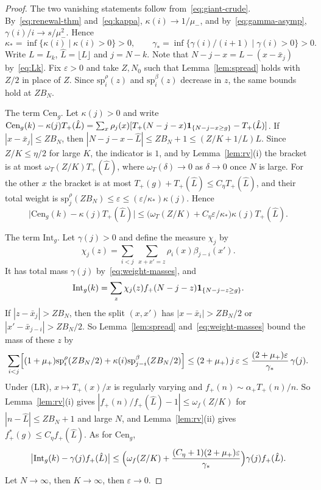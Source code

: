 \begin{proof}
The two vanishing statements follow from~\eqref{eq:giant-crude}.
By~\eqref{eq:renewal-thm} and~\eqref{eq:kappa}, $\kappa(i)\to1/\mu_\minus$, and
by~\eqref{eq:gamma-asymp}, $\gamma(i)/i\to s/\mu_\minus^2$. Hence
\[
 \kappa_*=\inf\{\kappa(i)\mid\kappa(i)>0\}>0,\qquad
 \gamma_*=\inf\{\gamma(i)/(i+1)\mid\gamma(i)>0\}>0 .
\]
Write $L=L_k$, $\hat L=\lfloor L\rfloor$ and $j=N-k$. Note that
$N-j-x=L-(x-\bar x_j)$ by~\eqref{eq:Lk}. Fix $\varepsilon>0$ and take
$Z,N_0$ such that Lemma~\ref{lem:spread} holds with $Z/2$ in place of $Z$. Since
$\mathrm{sp}^\rho_i(z)$ and $\mathrm{sp}^\beta_i(z)$ decrease in $z$, the same bounds
hold at $ZB_N$.

The term $\mathrm{Cen}_g$. Let $\kappa(j)>0$ and write
$\mathrm{Cen}_g(k)-\kappa(j)T_{+}(\hat L)=\sum_x\rho_j(x)[T_{+}(N-j-x)\mathbf{1}_{\{N-j-x\ge g\}}-T_{+}(\hat L)]$.
If $|x-\bar x_j|\le ZB_N$, then $|N-j-x-\hat L|\le ZB_N+1\le(Z/K+1/L)L$.
Since $Z/K\le\eta/2$ for large $K$, the indicator is $1$, and by
Lemma~\ref{lem:rv}(i) the bracket is at most $\omega_T(Z/K)T_\plus(\hat L)$, where
$\omega_T(\delta)\to0$ as $\delta\to0$ once $N$ is large. For the other $x$ the
bracket is at most $T_\plus(g)+T_\plus(\hat L)\le C_\eta T_\plus(\hat L)$, and their
total weight is $\mathrm{sp}^\rho_j(ZB_N)\le\varepsilon\le(\varepsilon/\kappa_*)\kappa(j)$.
Hence
\[
 \bigl|\mathrm{Cen}_g(k)-\kappa(j)T_\plus(\hat L)\bigr|\le\bigl(\omega_T(Z/K)+C_\eta\varepsilon/\kappa_*\bigr)\kappa(j)T_\plus(\hat L).
\]

The term $\mathrm{Int}_g$. Let $\gamma(j)>0$ and define the measure $\chi_j$ by
\[
 \chi_j(z)=\sum_{i<j}\ \sum_{x+x'=z}\rho_i(x)\beta_{j-i}(x').
\]
It has total mass $\gamma(j)$ by~\eqref{eq:weight-masses}, and
\[
 \mathrm{Int}_g(k)=\sum_z\chi_j(z)f_{+}(N-j-z)\mathbf{1}_{\{N-j-z\ge g\}} .
\]
If $|z-\bar x_j|>ZB_N$, then the split $(x,x')$ has $|x-\bar x_i|>ZB_N/2$ or
$|x'-\bar x_{j-i}|>ZB_N/2$. So Lemma~\ref{lem:spread} and~\eqref{eq:weight-masses}
bound the mass of these $z$ by
\[
 \sum_{i<j}\Bigl[(1+\mu_{+})\mathrm{sp}^\rho_i(ZB_N/2)+\kappa(i)\mathrm{sp}^\beta_{j-i}(ZB_N/2)\Bigr]\le(2+\mu_{+})\,j\,\varepsilon
 \le\frac{(2+\mu_{+})\varepsilon}{\gamma_*}\,\gamma(j).
\]
Under (LR), $x\mapsto T_\plus(x)/x$ is regularly varying and
$f_\plus(n)\sim\alpha_\plus T_\plus(n)/n$. So Lemma~\ref{lem:rv}(i) gives
$|f_\plus(n)/f_\plus(\hat L)-1|\le\omega_f(Z/K)$ for $|n-\hat L|\le ZB_N+1$ and
large $N$, and Lemma~\ref{lem:rv}(ii) gives $f^*_\plus(g)\le C_\eta f_\plus(\hat L)$.
As for $\mathrm{Cen}_g$,
\[
 \bigl|\mathrm{Int}_g(k)-\gamma(j)f_{+}(\hat L)\bigr|\le\Bigl(\omega_f(Z/K)+\frac{(C_\eta+1)(2+\mu_{+})\varepsilon}{\gamma_*}\Bigr)\gamma(j)f_{+}(\hat L).
\]
Let $N\to\infty$, then $K\to\infty$, then $\varepsilon\to0$.
\end{proof}

